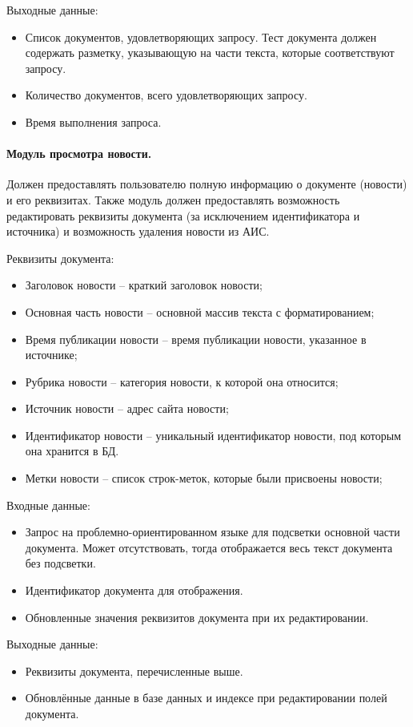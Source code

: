 Выходные данные:
\begin{itemize}
\item Список документов, удовлетворяющих запросу. Тест документа должен содержать разметку, указывающую на части текста, которые соответствуют запросу.
\item Количество документов, всего удовлетворяющих запросу.
\item Время выполнения запроса.
\end{itemize}

\paragraph{Модуль просмотра новости.} 
Должен предоставлять пользователю полную информацию о документе (новости) и его реквизитах. Также модуль должен предоставлять возможность редактировать реквизиты документа (за исключением идентификатора и источника) и возможность удаления новости из АИС.

Реквизиты документа:
\begin{itemize}
\item Заголовок новости -- краткий заголовок новости;
\item Основная часть новости -- основной массив текста с форматированием;
\item Время публикации новости -- время публикации новости, указанное в
источнике;
\item Рубрика новости -- категория новости, к которой она относится;
\item Источник новости -- адрес сайта новости;
\item Идентификатор новости -- уникальный идентификатор новости, под
которым она хранится в БД.
\item Метки новости -- список строк-меток, которые были присвоены новости;
\end{itemize}

Входные данные:
\begin{itemize}
\item Запрос на проблемно-ориентированном языке для подсветки основной части документа. Может отсутствовать, тогда отображается весь текст документа без подсветки.
\item Идентификатор документа для отображения.
\item Обновленные значения реквизитов документа при их редактировании.
\end{itemize}

Выходные данные:
\begin{itemize}
\item Реквизиты документа, перечисленные выше.
\item Обновлённые данные в базе данных и индексе при редактировании полей документа.
\end{itemize}

